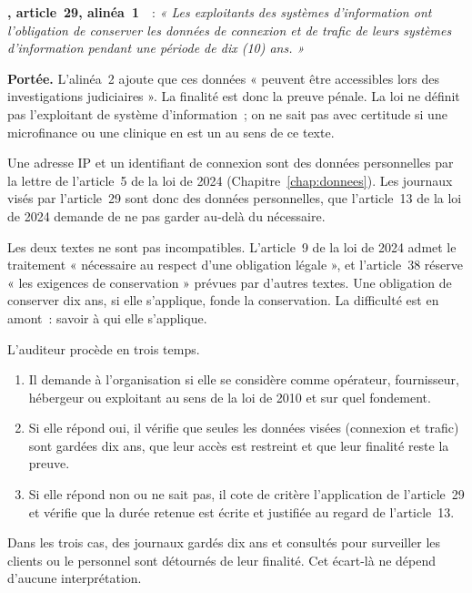\begin{boxjuris}
\textbf{, article~29, alinéa~1}~\cite{loi2010012}~:
\textit{« Les exploitants des systèmes d'information ont l'obligation de
conserver les données de connexion et de trafic de leurs systèmes
d'information pendant une période de dix (10) ans. »}

\smallskip
\textbf{Portée.} L'alinéa~2 ajoute que ces données « peuvent être
accessibles lors des investigations judiciaires ». La finalité est donc la
preuve pénale. La loi ne définit pas l'exploitant de système d'information~;
on ne sait pas avec certitude si une microfinance ou une clinique en est un
au sens de ce texte.
\end{boxjuris}

Une adresse IP et un identifiant de connexion sont des données personnelles
par la lettre de l'article~5 de la loi de 2024 (Chapitre~\ref{chap:donnees}).
Les journaux visés par l'article~29 sont donc des données personnelles, que
l'article~13 de la loi de 2024 demande de ne pas garder au-delà du
nécessaire.

Les deux textes ne sont pas incompatibles. L'article~9 de la loi de 2024
admet le traitement « nécessaire au respect d'une obligation légale », et
l'article~38 réserve « les exigences de conservation » prévues par d'autres
textes. Une obligation de conserver dix ans, si elle s'applique, fonde la
conservation. La difficulté est en amont~: savoir à qui elle s'applique.

L'auditeur procède en trois temps.

\begin{enumerate}
    \item Il demande à l'organisation si elle se considère comme opérateur,
          fournisseur, hébergeur ou exploitant au sens de la loi de 2010
          et sur quel fondement.
    \item Si elle répond oui, il vérifie que seules les données visées
          (connexion et trafic) sont gardées dix ans, que leur accès est
          restreint et que leur finalité reste la preuve.
    \item Si elle répond non ou ne sait pas, il cote \NEK{} de critère
          l'application de l'article~29 et vérifie que la durée retenue est
          écrite et justifiée au regard de l'article~13.
\end{enumerate}

Dans les trois cas, des journaux gardés dix ans et consultés pour surveiller
les clients ou le personnel sont détournés de leur finalité. Cet écart-là ne
dépend d'aucune interprétation.

